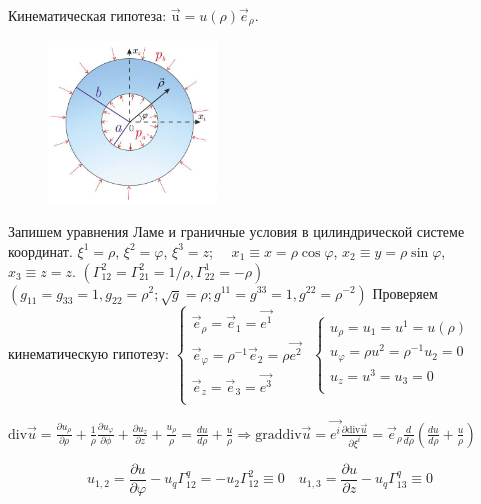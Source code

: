 Кинематическая гипотеза: $\overrightarrow{\mathrm{u}}=u(\rho) \vec{e}_\rho$. 

\begin{figure}[h!]
  \centering
  \includegraphics[width=0.4\textwidth]{images/18.1.jpg}
\end{figure}



Запишем
уравнения Ламе и граничные условия в цилиндрической системе координат. 
$ \xi^1=\rho$, $ \xi^2=\varphi$, $\xi^3=z$; $\quad x_1 \equiv x=\rho \cos \varphi$, $x_2 \equiv y=\rho \sin \varphi$, $x_3 \equiv z=z$.
$(\Gamma_{12}^2=\Gamma_{21}^2=1 / \rho, \Gamma_{22}^1=-\rho) $ $(g_{11}=g_{33}=1, g_{22}=\rho^2 ; \sqrt{g}=\rho ; g^{11}=g^{33}=1, g^{22}=\rho^{-2})$
Проверяем кинематическую гипотезу:
$\left\{ \begin{array}{c}
     \vec{e}_\rho=\vec{e}_1=\vec{e^1}\\
     \vec{e}_\varphi=\rho^{-1} \vec{e}_2=\rho \vec{e^2}\\
      \vec{e}_z=\vec{e}_3=\vec{e^{3}}\\
        \end{array}\right.$
$\left\{ \begin{array}{c}
     u_{\rho}=u_1=u^1=u(\rho) \\
      u_{\varphi}=\rho u^2=\rho^{-1} u_2=0\\
      u_z=u^3=u_3=0\\
        \end{array}\right.$
 
$ 
\displaystyle
\mathrm{div} \vec{u}=\frac{\partial u_\rho}{\partial \rho}+\frac{1}{\rho} \frac{\partial u_{\varphi}}{\partial \phi}+\frac{\partial u_z}{\partial z}+\frac{u_\rho}{\rho}=\frac{d u}{d \rho}+\frac{u}{\rho} \Rightarrow \mathrm{grad} \mathrm{div} \vec{u}=\vec{e^i} \frac{\partial \mathrm{div} \vec{u}}{\partial \xi^i}=\vec{e}_\rho \frac{d}{d \rho}\left(\frac{d u}{d \rho}+\frac{u}{\rho}\right)
$

$$
u_{1,2}=\frac{\partial u}{\partial \varphi}-u_q \Gamma_{12}^q=-u_2 \Gamma_{12}^2 \equiv 0 \quad
u_{1,3}=\frac{\partial u}{\partial z}-u_q \Gamma_{13}^q \equiv 0
$$


